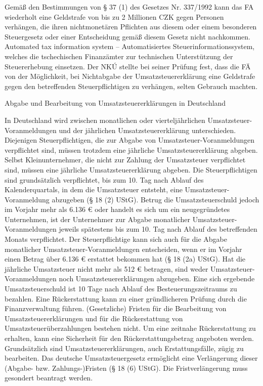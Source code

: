 \documentclass[10pt]{article}
\begin{document}
Gemäß den Bestimmungen von § 37 (1) des Gesetzes Nr. 337/1992 kann das FA wiederholt eine Geldstrafe von bis zu 2 Millionen CZK gegen Personen verhängen, die ihren nichtmonetären Pﬂichten aus diesem oder einem besonderen Steuergesetz oder einer Entscheidung gemäß diesem Gesetz nicht nachkommen.
Automated tax information system – Automatisiertes Steuerinformationssystem, welches die tschechischen Finanzämter zur technischen Unterstützung der Steuererhebung einsetzen.
Der NKÚ stellte bei seiner Prüfung fest, dass die FÄ von der Möglichkeit, bei Nichtabgabe der Umsatzsteuererklärung eine Geldstrafe gegen den betreffenden Steuerpﬂichtigen zu verhängen, selten Gebrauch machten.


Abgabe und Bearbeitung von Umsatzsteuererklärungen in Deutschland

In Deutschland wird zwischen monatlichen oder vierteljährlichen Umsatzsteuer-Voranmeldungen und der jährlichen Umsatzsteuererklärung unterschieden.
Diejenigen Steuerpﬂichtigen, die zur Abgabe von Umsatzsteuer-Voranmeldungen verpﬂichtet sind, müssen trotzdem eine jährliche Umsatzsteuererklärung abgeben.
Selbst Kleinunternehmer, die nicht zur Zahlung der Umsatzsteuer verpﬂichtet sind, müssen eine jährliche Umsatzsteuererklärung abgeben.
Die Steuerpﬂichtigen sind grundsätzlich verpﬂichtet, bis zum 10. Tag nach Ablauf des Kalenderquartals, in dem die Umsatzsteuer entsteht, eine Umsatzsteuer-Voranmeldung abzugeben (§ 18 (2) UStG).
Betrug die Umsatzsteuerschuld jedoch im Vorjahr mehr als 6.136 € oder handelt es sich um ein neugegründetes Unternehmen, ist der Unternehmer zur Abgabe monatlicher Umsatzsteuer-Voranmeldungen jeweils spätestens bis zum 10. Tag nach Ablauf des betreffenden Monats verpﬂichtet.
Der Steuerpﬂichtige kann sich auch für die Abgabe monatlicher Umsatzsteuer-Voranmeldungen entscheiden, wenn er im Vorjahr einen Betrag über 6.136 € erstattet bekommen hat (§ 18 (2a) UStG).
Hat die jährliche Umsatzsteuer nicht mehr als 512 € betragen, sind weder Umsatzsteuer-Voranmeldungen noch Umsatzsteuererklärungen abzugeben.
Eine sich ergebende Umsatzsteuerschuld ist 10 Tage nach Ablauf des Besteuerungszeitraums zu bezahlen.
Eine Rückerstattung kann zu einer gründlicheren Prüfung durch die Finanzverwaltung führen.
(Gesetzliche) Fristen für die Bearbeitung von Umsatzsteuererklärungen und für die Rückerstattung von Umsatzsteuerüberzahlungen bestehen nicht.
Um eine zeitnahe Rückerstattung zu erhalten, kann eine Sicherheit für den Rückerstattungsbetrag angeboten werden.
Grundsätzlich sind Umsatzsteuererklärungen, auch Erstattungsfälle, zügig zu bearbeiten.
Das deutsche Umsatzsteuergesetz ermöglicht eine Verlängerung dieser (Abgabe- bzw. Zahlungs-)Fristen (§ 18 (6) UStG).
Die Fristverlängerung muss gesondert beantragt werden.
\end{document}
